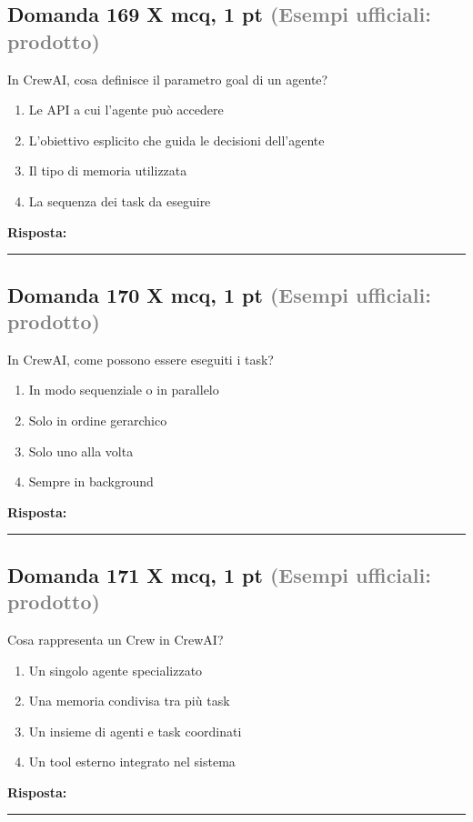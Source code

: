 \documentclass[a4paper,11pt]{article}
\begin{document}
\subsection*{Domanda 169 X \hfill {\small mcq, 1 pt \textcolor{gray}{(Esempi ufficiali: prodotto)}}}
In CrewAI, cosa definisce il parametro goal di un agente?

\begin{enumerate}[label=\alph*)]
\item Le API a cui l'agente può accedere
\item L'obiettivo esplicito che guida le decisioni dell'agente
\item Il tipo di memoria utilizzata
\item La sequenza dei task da eseguire
\end{enumerate}
\vspace{0.2cm}
\noindent\textbf{Risposta:}\par
\vspace{1.5cm}\hrule


\subsection*{Domanda 170 X \hfill {\small mcq, 1 pt \textcolor{gray}{(Esempi ufficiali: prodotto)}}}
In CrewAI, come possono essere eseguiti i task?

\begin{enumerate}[label=\alph*)]
\item In modo sequenziale o in parallelo
\item Solo in ordine gerarchico
\item Solo uno alla volta
\item Sempre in background
\end{enumerate}
\vspace{0.2cm}
\noindent\textbf{Risposta:}\par
\vspace{1.5cm}\hrule


\subsection*{Domanda 171 X \hfill {\small mcq, 1 pt \textcolor{gray}{(Esempi ufficiali: prodotto)}}}
Cosa rappresenta un Crew in CrewAI?

\begin{enumerate}[label=\alph*)]
\item Un singolo agente specializzato
\item Una memoria condivisa tra più task
\item Un insieme di agenti e task coordinati
\item Un tool esterno integrato nel sistema
\end{enumerate}
\vspace{0.2cm}
\noindent\textbf{Risposta:}\par
\vspace{1.5cm}\hrule
\end{document}
